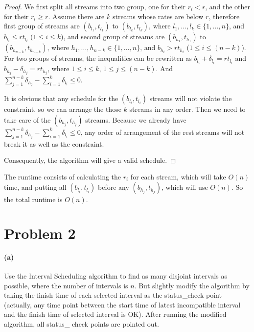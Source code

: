 \documentclass[letter,12pt]{article}
\begin{document}
\begin{proof}
We first split all streams into two group, one for their $r_i < r$, and the
other for their $r_i \geq r$. Assume there are $k$ streams whose rates
are below $r$, therefore first group of streams are $(b_{l_1}, t_{l_1})$ to
$(b_{l_k}, t_{l_k})$, where $l_1, ..., l_k \in \{1, ..., n\}$, and $b_{l_i} \le 
rt_{l_i}$ ($1 \le i \le k$), and second group of streams are $(b_{h_1}, 
t_{h_1})$ to $(b_{h_{n-k}}, t_{h_{n-k}})$, where $h_1, ..., h_{n-k} \in 
\{1, ..., n\}$, and $b_{h_i} > rt_{h_i}$ ($1 \le i \le (n-k)$). For two groups
of streams, the inequalities can be rewritten as $b_{l_i} + \delta_{l_i} 
= rt_{l_i}$ and $b_{h_j} - \delta_{h_j} = rt_{h_j}$, where $1 \le i \le k$,
$1 \le j \le (n-k)$. And $\sum\limits_{j=1}^{n-k} \delta_{h_j} - \sum\limits_{i=1}^k \delta_{l_i} \le 0$.

It is obvious that any schedule for the $(b_{l_i}, t_{l_i})$ streams will not
violate the constraint, so we can arrange the those $k$ streams in any
order. Then we need to take care of the $(b_{h_j}, t_{h_j})$ streams.
Because we already have $\sum\limits_{j=1}^{n-k} \delta_{h_j} - \sum\limits_{i=1}^k \delta_{l_i} \le 0$, any order of arrangement of 
the rest streams will not break it as well as the constraint.

Consequently, the algorithm will give a valid schedule.
\end{proof}

The runtime consists of calculating the $r_i$ for each stream, which
will take $O(n)$ time, and putting all $(b_{l_i}, t_{l_i})$ before any
$(b_{h_j}, t_{h_j})$, which will use $O(n)$. So the total runtime is $O(n)$.

\section*{Problem 2}
\paragraph*{(a)}
Use the Interval Scheduling algorithm to find as many disjoint intervals
as possible, where the number of intervals is $n$. But slightly modify
the algorithm by taking the finish time of each selected interval as
the \textsf{status\_check} point (actually, any time point between the
start time of latest incompatible interval and the finish time of selected
interval is OK). After running the modified algorithm, all \textsf{status\_
check} points are pointed out. 
\end{document}
